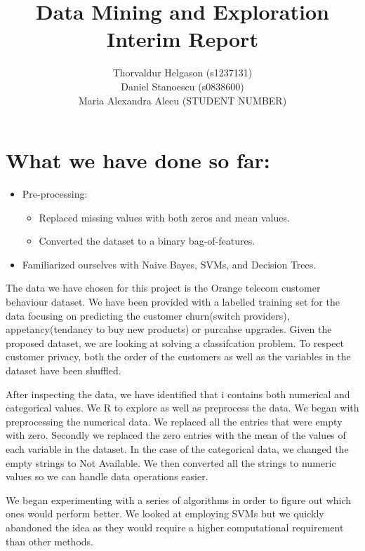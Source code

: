\documentclass[a4paper,11pt]{article}
\title{Data Mining and Exploration\\Interim Report}
\author{Thorvaldur Helgason (s1237131) \\
Daniel Stanoescu (s0838600) \\
Maria Alexandra Alecu (STUDENT NUMBER)}
\begin{document}
    
\maketitle



\section*{What we have done so far:}
\begin{itemize}
	\item Pre-processing:
	\begin{itemize}
		\item Replaced missing values with both zeros and mean values.
		\item Converted the dataset to a binary bag-of-features.
	\end{itemize}
	\item Familiarized ourselves with Naive Bayes, SVMs, and Decision Trees.  
\end{itemize}

The data we have chosen for this project is the Orange telecom customer behaviour dataset. We have been provided with a labelled training set for the data focusing on predicting the customer churn(switch providers), appetancy(tendancy to buy new products) or purcahse upgrades. Given the proposed dataset, we are looking at solving a classifcation problem.  To respect customer privacy, both the order of the customers as well as the variables in the dataset have been shuffled.

After inspecting the data, we have identified that i contains both numerical and categorical values. We R to explore as well as preprocess the data. We began with preprocessing the numerical data. We replaced all the entries that were empty with zero. Secondly we replaced the zero entries with the mean of the values of each variable in the dataset. In the case of the categorical data, we changed the empty strings to Not Available. We then converted all the strings to numeric values so we can handle data operations easier.

We began experimenting with a series of algorithms in order to figure out which ones would perform better. We looked at employing SVMs but we quickly abandoned the idea as they would require a higher computational requirement than other methods.
\end{document}
